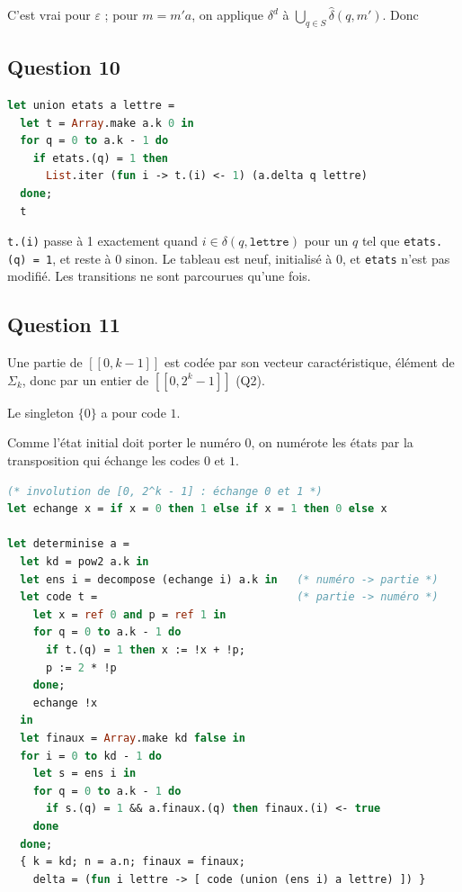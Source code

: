 \documentclass[11pt,a4paper]{article}
\newcommand{\equationajustee}[1]{%
  \sbox{\boiteequation}{$\displaystyle #1$}%
  \ifdim\wd\boiteequation>\linewidth
    \[\resizebox{\linewidth}{!}{\usebox{\boiteequation}}\]%
  \else
    \[#1\]%
  \fi}
\begin{document}
C'est vrai pour \(\varepsilon\) ; pour \(m=m'a\), on applique \(\delta^d\) à \(\bigcup_{q\in S}\widehat\delta(q,m')\). Donc

\equationajustee{m\in\mathcal{L}({\mathcal{A}}^d)\iff\widehat\delta(q_0,m)\cap F\ne\emptyset\iff m\in\mathcal{L}(\mathcal{A}).}

\hypertarget{question-10}{%
\subsection{Question 10}\label{question-10}}

\begin{lstlisting}[language=Caml]
let union etats a lettre =
  let t = Array.make a.k 0 in
  for q = 0 to a.k - 1 do
    if etats.(q) = 1 then
      List.iter (fun i -> t.(i) <- 1) (a.delta q lettre)
  done;
  t
\end{lstlisting}

\texttt{t.(i)} passe à 1 exactement quand \(i\in\delta(q,\texttt{lettre})\) pour un \(q\) tel que \texttt{etats.(q)\ =\ 1}, et reste à 0 sinon. Le tableau est neuf, initialisé à 0, et \texttt{etats} n'est pas modifié. Les transitions ne sont parcourues qu'une fois.

\hypertarget{question-11}{%
\subsection{Question 11}\label{question-11}}

Une partie de \([\![0,k-1]\!]\) est codée par son vecteur caractéristique, élément de \(\Sigma_k\), donc par un entier de \([\![0,2^k-1]\!]\) (Q2).

Le singleton \(\{0\}\) a pour code \(1\).

Comme l'état initial doit porter le numéro \(0\), on numérote les états par la transposition qui échange les codes \(0\) et \(1\).

\begin{lstlisting}[language=Caml]
(* involution de [0, 2^k - 1] : échange 0 et 1 *)
let echange x = if x = 0 then 1 else if x = 1 then 0 else x

let determinise a =
  let kd = pow2 a.k in
  let ens i = decompose (echange i) a.k in   (* numéro -> partie *)
  let code t =                               (* partie -> numéro *)
    let x = ref 0 and p = ref 1 in
    for q = 0 to a.k - 1 do
      if t.(q) = 1 then x := !x + !p;
      p := 2 * !p
    done;
    echange !x
  in
  let finaux = Array.make kd false in
  for i = 0 to kd - 1 do
    let s = ens i in
    for q = 0 to a.k - 1 do
      if s.(q) = 1 && a.finaux.(q) then finaux.(i) <- true
    done
  done;
  { k = kd; n = a.n; finaux = finaux;
    delta = (fun i lettre -> [ code (union (ens i) a lettre) ]) }
\end{lstlisting}
\end{document}
